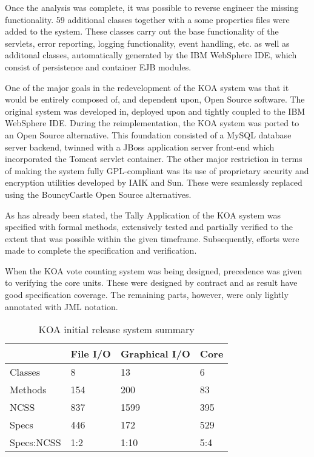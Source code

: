 \documentclass[times, 10pt, twocolumn]{article}
\begin{document}
Once the analysis was complete, it was possible to reverse engineer the missing 
functionality. 59 additional classes together with a some properties files were 
added to the system. These classes carry out the base functionality of the 
servlets, error reporting, logging functionality, event handling, etc. as well 
as additonal classes, automatically generated by the IBM WebSphere IDE, which 
consist of persistence and container EJB modules.

\label{subsubsec:full-open-source}

One of the major goals in the redevelopment of the KOA system was that it would 
be entirely composed of, and dependent upon, Open Source software.  The 
original system was developed in, deployed upon and tightly coupled to the IBM 
WebSphere IDE.  During the reimplementation, the KOA system was ported to an 
Open Source alternative.  This foundation consisted of a MySQL 
database server backend, twinned with a JBoss application server front-end 
which incorporated the Tomcat servlet container.  The other major restriction 
in terms of making the system fully GPL-compliant was its use of proprietary 
security and encryption utilities developed by IAIK and Sun.  These were 
seamlessly replaced using the BouncyCastle Open Source alternatives.


As has already been stated, the Tally Application of the KOA system was 
specified with formal methods, extensively tested and partially verified to the 
extent that was possible within the given timeframe. Subsequently, efforts were 
made to complete the specification and verification\cite{Fairmichael05}.

When the KOA vote counting system was being designed, precedence was given to 
verifying the core units. These were designed by contract and as result have 
good specification coverage. The remaining parts, however, were only lightly 
annotated with JML notation.

\begin{table}
\begin{center}
\begin{tabular}{|l|l|l|l|}
\hline & {\bf File I/O } & {\bf Graphical I/O} & {\bf Core} \\ \hline Classes & 
8 & 13 & 6 \\

Methods & 154 & 200 & 83 \\

NCSS & 837 & 1599 & 395 \\

Specs & 446 & 172 & 529 \\

Specs:NCSS & 1:2 & 1:10 & 5:4\\ \hline
\end{tabular}
\end{center}
\caption{KOA initial release system summary}
\label{table}
\end{table}
\end{document}
